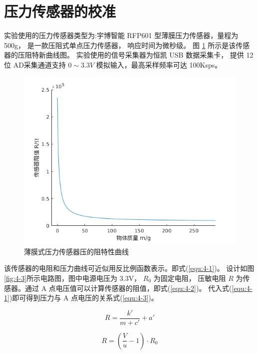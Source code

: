 \section{压力传感器的校准}
实验使用的压力传感器类型为:宇博智能 RFP601 型薄膜压力传感器，量程为500g，
是一款压阻式单点压力传感器， 响应时间为微秒级。
图 \ref{fig:4-2} 所示是该传感器的压阻特新曲线图。
实验使用的信号采集器为恒凯 USB 数据采集卡，
提供 12 位 AD采集通道支持 $0\sim 3.3V$ 模拟输入，最高采样频率可达 100Ksps。

\begin{figure}[!ht]
  \centering
  \includegraphics[width=12cm]{chapter04/pic/4-2}
  \caption{薄膜式压力传感器压的阻特性曲线}
  \label{fig:4-2}
  \vspace{-0.3cm}
\end{figure}

该传感器的电阻和压力曲线可近似用反比例函数表示。即式(\ref{equ:4-1})。
设计如图\ref{fig:4-3}所示电路图，图中电源电压为 3.3V， $R_0$ 为固定电阻，
压敏电阻 $R$ 为传感器。通过 A 点电压值可以计算传感器的阻值，即式(\ref{equ:4-2})。
代入式(\ref{equ:4-1})即可得到压力与 A 点电压的关系式(\ref{equ:4-3})。

\vspace{-10pt}
\begin{equation}
  \label{equ:4-1}
  R = \frac{{k'}}{{m + c'}} + a'
\end{equation}
\vspace{-30pt}

\begin{equation}
  \label{equ:4-2}
  R = (\frac{V}{u} - 1) \cdot {R_0}
\end{equation}
\vspace{-30pt}

